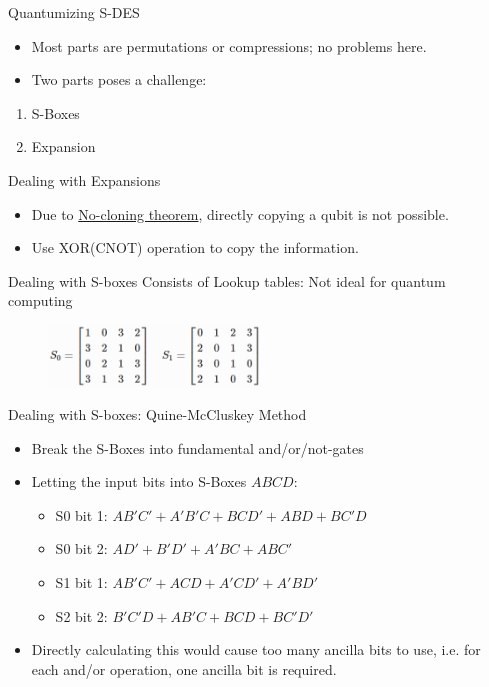 \documentclass{beamer}
\begin{document}
    \begin{frame}{Quantumizing S-DES}
        \begin{itemize}
            \item Most parts are permutations or compressions; no problems here.
            \item Two parts poses a challenge:
        \end{itemize}
        \begin{enumerate}
            \item S-Boxes
            \item Expansion
        \end{enumerate}
    \end{frame}

    \begin{frame}{Dealing with Expansions}
        \begin{itemize}
            \item Due to \href{https://en.wikipedia.org/wiki/No-cloning_theorem}{No-cloning theorem}, directly copying a qubit is not possible.
            \item Use XOR(CNOT) operation to copy the information.
        \end{itemize}
    \end{frame}

    \begin{frame}{Dealing with S-boxes}
        Consists of Lookup tables: Not ideal for quantum computing
        \begin{figure}[h]
            \centering
            \includegraphics[width=0.5\textwidth]{./Images/sbox.png}
        \end{figure}
    \end{frame}

    \begin{frame}{Dealing with S-boxes: Quine-McCluskey Method}
        \begin{itemize}
            \item Break the S-Boxes into fundamental and/or/not-gates
            \item Letting the input bits into S-Boxes $ABCD$:
            \begin{itemize}
                \item S0 bit 1: $AB'C'+A'B'C+BCD'+ABD+BC'D$
                \item S0 bit 2: $AD'+B'D'+A'BC+ABC'$
                \item S1 bit 1: $AB'C'+ACD+A'CD'+A'BD'$
                \item S2 bit 2: $B'C'D+AB'C+BCD+BC'D'$
            \end{itemize}
            \item Directly calculating this would cause too many ancilla bits to use, i.e. for each and/or operation, one ancilla bit is required.
        \end{itemize}
    \end{frame}
\end{document}
